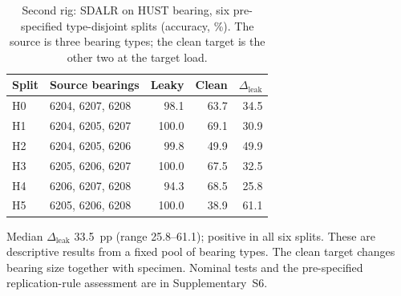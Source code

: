\begin{table}[htbp]
\centering
\caption{Second rig: SDALR on HUST bearing, six pre-specified type-disjoint splits (accuracy, \%). The source is three bearing types; the clean target is the other two at the target load.}
\label{tab:hust}
\begin{tabular}{llrrr}
\toprule
Split & Source bearings & Leaky & Clean & $\Delta_{\mathrm{leak}}$ \\
\midrule
H0 & 6204, 6207, 6208 & 98.1 & 63.7 & 34.5 \\
H1 & 6204, 6205, 6207 & 100.0 & 69.1 & 30.9 \\
H2 & 6204, 6205, 6206 & 99.8 & 49.9 & 49.9 \\
H3 & 6205, 6206, 6207 & 100.0 & 67.5 & 32.5 \\
H4 & 6206, 6207, 6208 & 94.3 & 68.5 & 25.8 \\
H5 & 6205, 6206, 6208 & 100.0 & 38.9 & 61.1 \\
\bottomrule
\end{tabular}
\begin{minipage}{\linewidth}\vspace{2pt}\footnotesize Median $\Delta_{\mathrm{leak}}$ 33.5~pp (range 25.8--61.1); positive in all six splits. These are descriptive results from a fixed pool of bearing types. The clean target changes bearing size together with specimen. Nominal tests and the pre-specified replication-rule assessment are in Supplementary~S6.\end{minipage}
\end{table}
